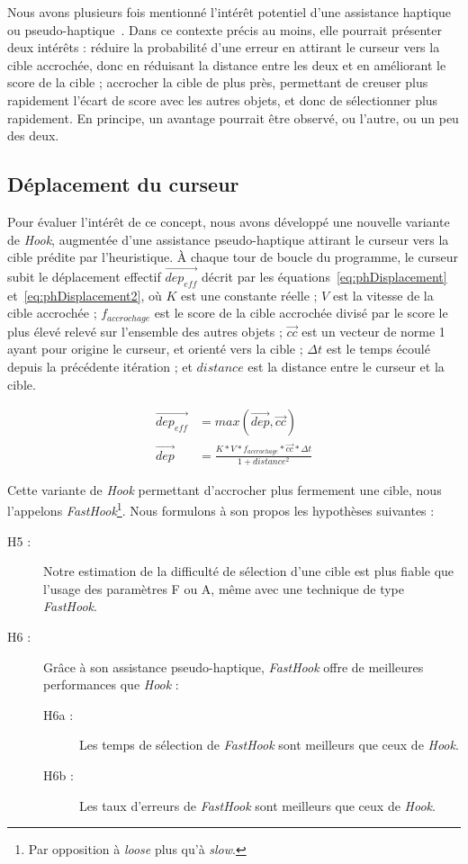 	Nous avons plusieurs fois mentionné l'intérêt potentiel d'une assistance haptique ou pseudo-haptique~\cite{lecuyer2009simulating, pusch2011pseudo}. Dans ce contexte précis au moins, elle pourrait présenter deux intérêts : réduire la probabilité d'une erreur en attirant le curseur vers la cible accrochée, donc en réduisant la distance entre les deux et en améliorant le score de la cible ; accrocher la cible de plus près, permettant de creuser plus rapidement l'écart de score avec les autres objets, et donc de sélectionner plus rapidement. En principe, un avantage pourrait être observé, ou l'autre, ou un peu des deux.
	
	\subsection{Déplacement du curseur}
	Pour évaluer l'intérêt de ce concept, nous avons développé une nouvelle variante de \emph{Hook}, augmentée d'une assistance pseudo-haptique attirant le curseur vers la cible prédite par l'heuristique. À chaque tour de boucle du programme, le curseur subit le déplacement effectif $\vec{dep_{eff}}$ décrit par les équations~\ref{eq:phDisplacement} et~\ref{eq:phDisplacement2}, où $K$ est une constante réelle ; $V$ est la vitesse de la cible accrochée ; $f_{accrochage}$ est le score de la cible accrochée divisé par le score le plus élevé relevé sur l'ensemble des autres objets ; $\vec{cc}$ est un vecteur de norme 1 ayant pour origine le curseur, et orienté vers la cible ; $\Delta{}t$ est le temps écoulé depuis la précédente itération ; et $distance$ est la distance entre le curseur et la cible.

	\begin{align}
		\label{eq:phDisplacement}
		\vec{dep_{eff}} &= max(\vec{dep}, \vec{cc}) \\
		\label{eq:phDisplacement2}
		\vec{dep} &= \frac{K * V * f_{accrochage} * \vec{cc} * \Delta{}t}{1 + distance^{2}}
	\end{align}
	
	Cette variante de \emph{Hook} permettant d'accrocher plus fermement une cible, nous l'appelons \emph{FastHook}\footnote{Par opposition à \emph{loose} plus qu'à \emph{slow}.}. Nous formulons à son propos les hypothèses suivantes :
	
	\begin{description}
		\item[H5 :] Notre estimation de la difficulté de sélection d'une cible est plus fiable que l'usage des paramètres F ou A, même avec une technique de type \emph{FastHook}.
		\item[H6 :] Grâce à son assistance pseudo-haptique, \emph{FastHook} offre de meilleures performances que \emph{Hook} :
		\begin{description}
			\item[H6a :] Les temps de sélection de \emph{FastHook} sont meilleurs que ceux de \emph{Hook}.
			\item[H6b :] Les taux d'erreurs de \emph{FastHook} sont meilleurs que ceux de \emph{Hook}.
		\end{description}
	\end{description}
	
